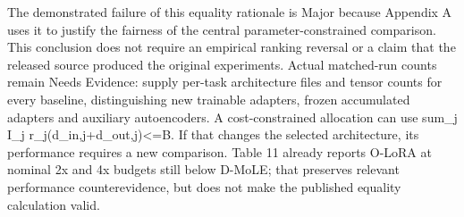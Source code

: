 \documentclass[10pt]{article}
\begin{document}
The demonstrated failure of this equality rationale is Major because Appendix A uses it to justify the fairness of the central parameter-constrained comparison. This conclusion does not require an empirical ranking reversal or a claim that the released source produced the original experiments. Actual matched-run counts remain Needs Evidence: supply per-task architecture files and tensor counts for every baseline, distinguishing new trainable adapters, frozen accumulated adapters and auxiliary autoencoders. A cost-constrained allocation can use sum\_j I\_j r\_j(d\_in,j+d\_out,j)<=B. If that changes the selected architecture, its performance requires a new comparison. Table 11 already reports O-LoRA at nominal 2x and 4x budgets still below D-MoLE; that preserves relevant performance counterevidence, but does not make the published equality calculation valid.\par
\end{document}
